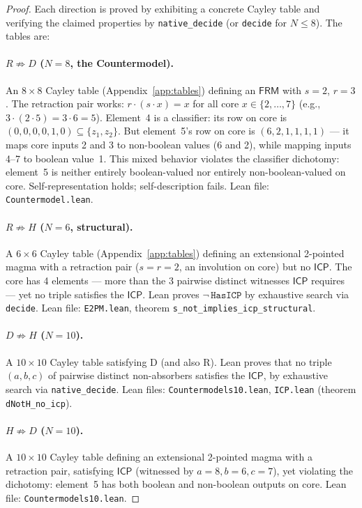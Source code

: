 \documentclass[a4paper,UKenglish,cleveref,autoref,thm-restate]{lipics-v2021}
\newcommand{\dotop}{\cdot}
\newcommand{\FRM}{\textsf{FRM}}
\newcommand{\ICP}{\textsf{ICP}}
\begin{document}
\begin{proof}
Each direction is proved by exhibiting a concrete Cayley table and verifying the claimed properties by \texttt{native\_decide} (or \texttt{decide} for $N \leq 8$). The tables are:

\paragraph{$R \not\Rightarrow D$ ($N\!=\!8$, the Countermodel).}
An $8 \times 8$ Cayley table (Appendix~\ref{app:tables}) defining an $\FRM$ with $s = 2$, $r = 3$. The retraction pair works: $r \dotop (s \dotop x) = x$ for all core $x \in \{2,\ldots,7\}$ (e.g., $3 \dotop (2 \dotop 5) = 3 \dotop 6 = 5$). Element~4 is a classifier: its row on core is $(0,0,0,0,1,0) \subseteq \{z_1, z_2\}$. But element~5's row on core is $(6, 2, 1, 1, 1, 1)$ --- it maps core inputs 2 and 3 to non-boolean values (6 and 2), while mapping inputs 4--7 to boolean value~1. This mixed behavior violates the classifier dichotomy: element~5 is neither entirely boolean-valued nor entirely non-boolean-valued on core. Self-representation holds; self-description fails. Lean file: \texttt{Countermodel.lean}.

\paragraph{$R \not\Rightarrow H$ ($N\!=\!6$, structural).}
A $6 \times 6$ Cayley table (Appendix~\ref{app:tables}) defining an extensional 2-pointed magma with a retraction pair ($s = r = 2$, an involution on core) but no $\ICP$. The core has 4 elements --- more than the 3 pairwise distinct witnesses $\ICP$ requires --- yet no triple satisfies the $\ICP$. Lean proves $\neg\,\texttt{HasICP}$ by exhaustive search via \texttt{decide}. Lean file: \texttt{E2PM.lean}, theorem \texttt{s\_not\_implies\_icp\_structural}.

\paragraph{$D \not\Rightarrow H$ ($N\!=\!10$).}
A $10 \times 10$ Cayley table satisfying D (and also R). Lean proves that no triple $(a, b, c)$ of pairwise distinct non-absorbers satisfies the $\ICP$, by exhaustive search via \texttt{native\_decide}. Lean files: \texttt{Countermodels10.lean}, \texttt{ICP.lean} (theorem \texttt{dNotH\_no\_icp}).

\paragraph{$H \not\Rightarrow D$ ($N\!=\!10$).}
A $10 \times 10$ Cayley table defining an extensional 2-pointed magma with a retraction pair, satisfying $\ICP$ (witnessed by $a\!=\!8, b\!=\!6, c\!=\!7$), yet violating the dichotomy: element~5 has both boolean and non-boolean outputs on core. Lean file: \texttt{Countermodels10.lean}.


\end{proof}
\end{document}
